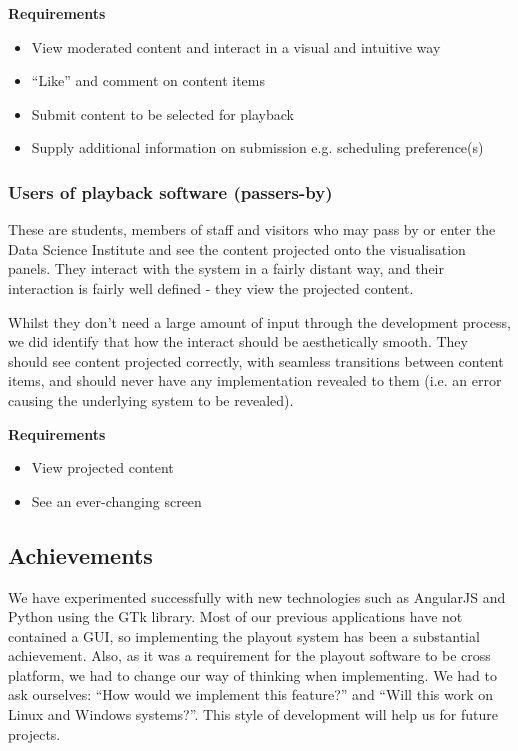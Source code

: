 \documentclass[a4paper, titlepage]{article}
\begin{document}
\textbf{Requirements}
\begin{itemize}
\itemsep-1mm
\item View moderated content and interact in a visual and intuitive way
\item ``Like'' and comment on content items
\item Submit content to be selected for playback
\item Supply additional information on submission e.g. scheduling preference(s)
\end{itemize}

\subsubsection{Users of playback software (passers-by)}

These are students, members of staff and visitors who may pass by or enter the Data Science Institute and see the content projected onto the visualisation panels. They interact with the system in a fairly distant way, and their interaction is fairly well defined - they view the projected content.

Whilst they don't need a large amount of input through the development process, we did identify that how the interact should be aesthetically smooth. They should see content projected correctly, with seamless transitions between content items, and should never have any implementation revealed to them (i.e. an error causing the underlying system to be revealed).

\textbf{Requirements}
\begin{itemize}
\itemsep-1mm
\item View projected content
\item See an ever-changing screen
\end{itemize}


\subsection{Achievements}
We have experimented successfully with new technologies such as AngularJS and Python using the GTk 
library. Most of our previous applications have not contained a GUI, so implementing the playout
system has been a substantial achievement. Also, as it was a requirement for the playout software 
to be cross platform, we had to change our way of thinking when implementing. We had to ask ourselves:
``How would we implement this feature?'' and ``Will this work on Linux and Windows systems?''. This 
style of development will help us for future projects.
\end{document}
